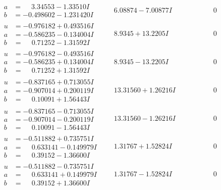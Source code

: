 \documentclass[1p]{elsarticle_modified}
\theoremstyle{definition}
\begin{document}
$$\begin{array}{c|c|c}
\begin{aligned}
a &= \phantom{-}3.34553 - 1.33510 I \\
b &= -0.498602 - 1.231420 I\end{aligned}
 & \phantom{-}6.08874 - 7.00877 I & \phantom{-0.000000 } 0 \\ \hline\begin{aligned}
u &= -0.976182 + 0.493516 I \\
a &= -0.586235 - 0.134004 I \\
b &= \phantom{-}0.71252 - 1.31592 I\end{aligned}
 & \phantom{-}8.9345 + 13.2205 I & \phantom{-0.000000 } 0 \\ \hline\begin{aligned}
u &= -0.976182 - 0.493516 I \\
a &= -0.586235 + 0.134004 I \\
b &= \phantom{-}0.71252 + 1.31592 I\end{aligned}
 & \phantom{-}8.9345 - 13.2205 I & \phantom{-0.000000 } 0 \\ \hline\begin{aligned}
u &= -0.837165 + 0.713055 I \\
a &= -0.907014 + 0.200119 I \\
b &= \phantom{-}0.10091 + 1.56443 I\end{aligned}
 & \phantom{-}13.31560 + 1.26216 I & \phantom{-0.000000 } 0 \\ \hline\begin{aligned}
u &= -0.837165 - 0.713055 I \\
a &= -0.907014 - 0.200119 I \\
b &= \phantom{-}0.10091 - 1.56443 I\end{aligned}
 & \phantom{-}13.31560 - 1.26216 I & \phantom{-0.000000 } 0 \\ \hline\begin{aligned}
u &= -0.511882 + 0.735751 I \\
a &= \phantom{-}0.633141 - 0.149979 I \\
b &= \phantom{-}0.39152 - 1.36600 I\end{aligned}
 & \phantom{-}1.31767 + 1.52824 I & \phantom{-0.000000 } 0 \\ \hline\begin{aligned}
u &= -0.511882 - 0.735751 I \\
a &= \phantom{-}0.633141 + 0.149979 I \\
b &= \phantom{-}0.39152 + 1.36600 I\end{aligned}
 & \phantom{-}1.31767 - 1.52824 I & \phantom{-0.000000 } 0\\

\end{array}$$
\end{document}
